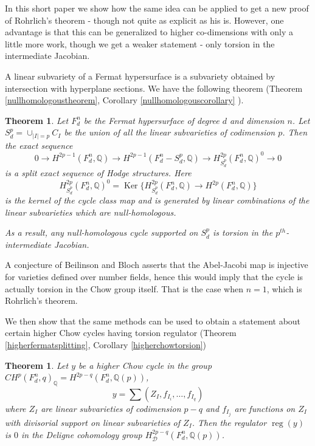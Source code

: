 \documentclass[12pt,reqno]{article}
\newtheorem{thm}[defn]{Theorem}
\newcommand {\Q}{{\mathds Q}}
\newcommand {\D}{{\mathcal D}}
\def\Ker{\operatorname{Ker}}
\def\reg{\operatorname{reg}}
\begin{document}
	In this short paper  we show how the same idea can be applied to get a new proof of Rohrlich's theorem - though not quite as explicit as his is. However, one advantage is that this can be generalized to higher co-dimensions with only a little more work, though we get a weaker statement - only torsion in the intermediate Jacobian. 
	
	A linear subvariety of a Fermat hypersurface is a subvariety obtained by intersection with hyperplane sections. We have the following theorem (Theorem \ref{nullhomologoustheorem}, Corollary \ref{nullhomologouscorollary} ).
	
	
	  \begin{thm} Let $F^n_d$ be the Fermat hypersurface of degree $d$ and dimension $n$. Let $S_d^p=\cup_{|I|=p} C_I$ be the union of all the linear subvarieties of codimension $p$.  Then the exact sequence 
		$$0 \rightarrow H^{2p-1}(F^n_d,\Q) \rightarrow H^{2p-1}(F^n_d-S_d^p,\Q) \rightarrow H^{2p}_{S_d^p}(F_d^n,\Q)^0 \rightarrow 0$$
		is a split exact sequence of Hodge structures. Here 
		$$H^{2p}_{S_d^p}(F_d^n,\Q)^0=\Ker\{H^{2p}_{S_d^p}(F^n_d,\Q) \rightarrow H^{2p}(F^n_d,\Q)\}$$
		is the kernel of the cycle class map and is generated by linear combinations of the linear subvarieties  which are null-homologous. 
		
		As a result, any null-homologous cycle supported on $S_d^p$ is torsion in the $p^{th}$-intermediate Jacobian. 
	
	\end{thm}
	A conjecture of Beilinson and Bloch asserts that the Abel-Jacobi map is injective for varieties defined over number fields, hence this would imply that the cycle is actually torsion in the Chow group itself. That is the case when $n=1$, which is Rohrlich's theorem. 
	
	 We then show  that the same methods can be used to obtain a statement about certain higher Chow cycles having torsion regulator (Theorem \ref{higherfermatsplitting}, Corollary \ref{higherchowtorsion})
	 
	 \begin{thm}
	 	Let $y$ be a higher Chow cycle  in the group $CH^p(F_d^n,q)_{\Q}=H^{2p-q}(F_d^n,\Q(p))$,
	 	$$y=\sum (Z_I,f_{I_i},\dots, f_{I_q})$$
	 	where $Z_I$ are linear subvarieties of codimension $p-q$ and $f_{I_j}$ are functions on $Z_I$ with  divisorial support on linear subvarieties of $Z_I$. Then the regulator $\reg(y)$ is $0$ in the Deligne cohomology group $H^{2p-q}_{\D}(F_d^n,\Q(p))$. 
	 
	 \end{thm}
	 
\end{document}
